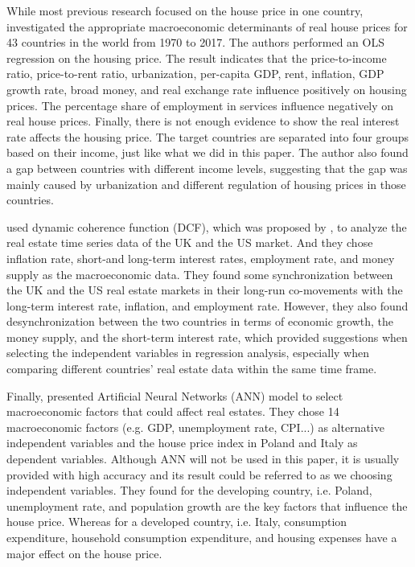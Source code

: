 \documentclass[11pt]{article}
\begin{document}
While most previous research focused on the house price in one country, \citet{RePEc:pra:mprapa:98089} investigated the appropriate macroeconomic determinants of real house prices for 43 countries in the world from 1970 to 2017. The authors performed an OLS regression on the housing price. The result indicates that the price-to-income ratio, price-to-rent ratio, urbanization, per-capita GDP, rent, inflation, GDP growth rate, broad money, and real exchange rate influence positively on housing prices. The percentage share of employment in services influence negatively on real house prices. Finally, there is not enough evidence to show the real interest rate affects the housing price. The target countries are separated into four groups based on their income, just like what we did in this paper. The author also found a gap between countries with different income levels, suggesting that the gap was mainly caused by urbanization and different regulation of housing prices in those countries.

\citet{BOUCHOUICHA20121820} used dynamic coherence function (DCF), which was proposed by \citet{10.2307/2984905}, to analyze the real estate time series data of the UK and the US market. And they chose inflation rate, short-and long-term interest rates, employment rate, and money supply as the macroeconomic data. They found some synchronization between the UK and the US real estate markets in their long-run co-movements with the long-term interest rate, inflation, and employment rate. However, they also found desynchronization between the two countries in terms of economic growth, the money supply, and the short-term interest rate, which provided suggestions when selecting the independent variables in regression analysis, especially when comparing different countries' real estate data within the same time frame.

Finally, \citet{PropertyPriceEurope} presented Artificial Neural Networks (ANN) model to select macroeconomic factors that could affect real estates. They chose 14 macroeconomic factors (e.g. GDP, unemployment rate, CPI...) as alternative independent variables and the house price index in Poland and Italy as dependent variables. Although ANN will not be used in this paper, it is usually provided with high accuracy and its result could be referred to as we choosing independent variables. They found for the developing country, i.e. Poland, unemployment rate, and population growth are the key factors that influence the house price. Whereas for a developed country, i.e. Italy, consumption expenditure, household consumption expenditure, and housing expenses have a major effect on the house price.
\end{document}
